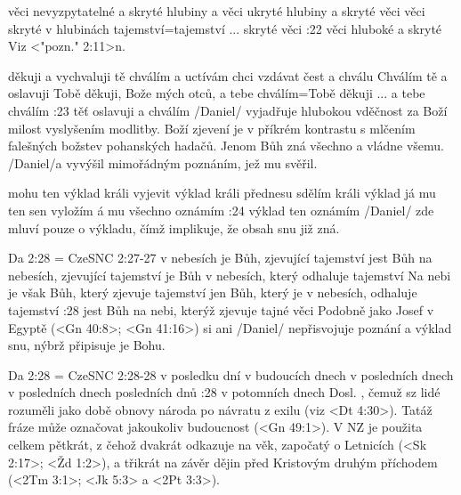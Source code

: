     {věci nevyzpytatelné a skryté} %
    {hlubiny a věci ukryté}  %
    {hlubiny a skryté věci} %
    {věci skryté v hlubinách}  %
    {tajemství}={tajemství ... skryté věci}  %
:22 {věci hluboké a skryté} Viz <"pozn." 2:11>n. 

    {děkuji a vychvaluji tě} %
    {chválím a uctívám}  %
    {chci vzdávat čest a chválu} %
    {Chválím tě a oslavuji}  %
    {Tobě děkuji, Bože mých otců, a tebe chválím}={Tobě děkuji ... a tebe chválím}  %
:23 {těť oslavuji a chválím} \x/Daniel/ vyjadřuje hlubokou vděčnost za Boží milost vyslyšením modlitby. Boží zjevení je v příkrém kontrastu s mlčením falešných božstev pohanských hadačů. Jenom Bůh zná všechno a vládne všemu. \x/Daniel/a vyvýšil mimořádným poznáním, jež mu svěřil.

    {mohu ten výklad králi vyjevit}  %
    {výklad králi přednesu}  %
    {sdělím králi výklad} %
    {já mu ten sen vyložím}  %
    {á mu všechno oznámím}  %
:24 {výklad ten oznámím} \x/Daniel/ zde mluví pouze o výkladu, čímž implikuje, že obsah snu  již zná.


\renum Da 2:28 = CzeSNC 2:27-27
    {v nebesích je Bůh, zjevující tajemství}  %
    {jest Bůh na nebesích, zjevující tajemství}  %
    {je Bůh v nebesích, který odhaluje tajemství}  %
    {Na nebi je však Bůh, který zjevuje tajemství}  %
    {jen Bůh, který je v nebesích, odhaluje tajemství}  %
:28 {jest Bůh na nebi, kterýž zjevuje tajné věci} Podobně jako Josef v Egyptě (<Gn 40:8>; <Gn 41:16>) si ani \x/Daniel/ nepřisvojuje poznání a výklad snu, nýbrž připisuje je Bohu.


\renum Da 2:28 = CzeSNC 2:28-28
    {v posledku dní} %
    {v budoucích dnech}  %
    {v posledních dnech} %
    {v posledních dnech}  %
    {posledních dnů}  %
:28 {v potomních dnech} Dosl. , čemuž sz lidé rozuměli jako době obnovy národa po návratu z exilu (viz <Dt 4:30>). Tatáž fráze může označovat 
    jakoukoliv budoucnost  (<Gn 49:1>).  V NZ je použita celkem pětkrát, z čehož dvakrát odkazuje na věk, započatý o Letnicích (<Sk 2:17>; <Žd 1:2>), a třikrát na závěr dějin před Kristovým druhým příchodem (<2Tm 3:1>; <Jk 5:3> a <2Pt 3:3>). 

